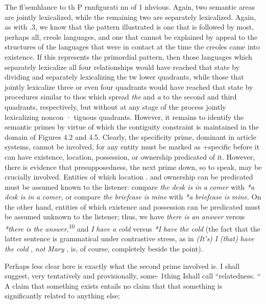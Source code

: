 The fl'semhlance to th P rnnfigurati nn of  1 nhvious. Again, two semantic areas are jointly lexicalized, while the remaining two are separately lexicalized. Again, as with .3, we know that the pattern illustrated is one that is followed by most, perhaps all, creole languages, and one that cannot be explained by appeal to the structures of the languages that were in contact at the time the creoles came into existence. If this represents the primordial pattern, then those languages which separately lexicalize all four relationships would have reached that state by dividing and separately lexicalizing the tw lower quadrants, while those that jointly lexicalize three or even four quadrants would have reached that state by procedures similar to thos
which spread \textit{the} and \textit{a} to the second and third quadrants, respectively, but without at any stage of the process jointly lexicalizing noncon · tiguous quadrants.
However, it remains to identify the semantic primes by virtue of which the contiguity constraint is maintained in the domain of Figures 4.2 and 4.5. Clearly, the specificity prime, dominant in article systems, cannot be involved, for any entity must be marked as +specific before it can have existence, location, possession, or ownership pre\-dicated of it. However, there is evidence that presupposedness, the next prime down, so to speak, may be crucially involved. Entities of which location . and ownership can be predicated must be assumed known to the listener: compare \textit{the} \textit{desk is} \textit{in} \textit{a} \textit{comer} with \textit{*a} \textit{desk} \textit{is} \textit{in} \textit{a} \textit{comer,} or compare \textit{the} \textit{briefcase} \textit{is} \textit{mine} with \textit{*a} \textit{briefcase} \textit{is} \textit{mine.} On the other hand, entities of which existence and possession can be predicated must be assumed unknown to the listener; thus, we have \textit{there} \textit{is} \textit{an} \textit{answer} versus \textit{*there} \textit{is} \textit{the} \textit{answer},\textsuperscript{1}\textsuperscript{0 }and \textit{I} \textit{have} \textit{a} \textit{cold} versus \textit{*I} \textit{have} \textit{the} \textit{cold} (the fact that the latter sentence is grammatical under contrastive stress, as in \textit{(It's)} \textit{I }\textit{(that)} \textit{have the} \textit{cold} , \textit{not} \textit{Mary} , is, of course, completely beside the point). 

Perhaps less clear here is exactly what the second prime in\-volved is. I shall suggest, very tentatively and provisionally, some- 1thing Ishall call ``relatedness. `` A claim that something exists entails
no claim that that something is significantly related to anything else;

